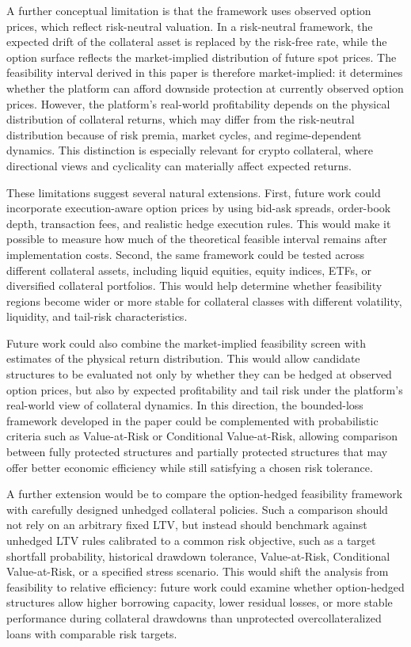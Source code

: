 \documentclass[11pt]{article}
\begin{document}
A further conceptual limitation is that the framework uses observed option prices, which reflect risk-neutral valuation. In a risk-neutral framework, the expected drift of the collateral asset is replaced by the risk-free rate, while the option surface reflects the market-implied distribution of future spot prices. The feasibility interval derived in this paper is therefore market-implied: it determines whether the platform can afford downside protection at currently observed option prices. However, the platform’s real-world profitability depends on the physical distribution of collateral returns, which may differ from the risk-neutral distribution because of risk premia, market cycles, and regime-dependent dynamics. This distinction is especially relevant for crypto collateral, where directional views and cyclicality can materially affect expected returns.

These limitations suggest several natural extensions. First, future work could incorporate execution-aware option prices by using bid-ask spreads, order-book depth, transaction fees, and realistic hedge execution rules. This would make it possible to measure how much of the theoretical feasible interval remains after implementation costs. Second, the same framework could be tested across different collateral assets, including liquid equities, equity indices, ETFs, or diversified collateral portfolios. This would help determine whether feasibility regions become wider or more stable for collateral classes with different volatility, liquidity, and tail-risk characteristics.

Future work could also combine the market-implied feasibility screen with estimates of the physical return distribution. This would allow candidate structures to be evaluated not only by whether they can be hedged at observed option prices, but also by expected profitability and tail risk under the platform’s real-world view of collateral dynamics. In this direction, the bounded-loss framework developed in the paper could be complemented with probabilistic criteria such as Value-at-Risk or Conditional Value-at-Risk, allowing comparison between fully protected structures and partially protected structures that may offer better economic efficiency while still satisfying a chosen risk tolerance.

A further extension would be to compare the option-hedged feasibility framework with carefully designed unhedged collateral policies. Such a comparison should not rely on an arbitrary fixed LTV, but instead should benchmark against unhedged LTV rules calibrated to a common risk objective, such as a target shortfall probability, historical drawdown tolerance, Value-at-Risk, Conditional Value-at-Risk, or a specified stress scenario. This would shift the analysis from feasibility to relative efficiency: future work could examine whether option-hedged structures allow higher borrowing capacity, lower residual losses, or more stable performance during collateral drawdowns than unprotected overcollateralized loans with comparable risk targets.
\end{document}
